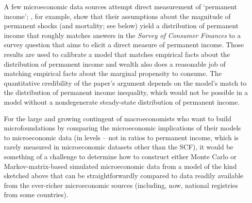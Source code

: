 \documentclass[BufferStockTheory]{subfiles}
\begin{document}
\begin{comment}
The problem is not with the growth factor $\PGro$; the same point would hold with $\PGro=1$, in which case the proposition would become
\begin{align}
    \cv(\cRat_{t+1},\pLevBF_{t+1})   & = \cv(\cRat_{t},\pLevBF_{t}) \label{eq:covSolnStable} .
\end{align}
\end{comment}

A few microeconomic data sources attempt direct measurement of `permanent income'; \cite{cstwMPC}, for example, show that their assumptions about the magnitude of permanent shocks (and mortality; see below) yield a distribution of permanent income that roughly matches answers in the \emph{Survey of Consumer Finances} to a survey question that aims to elicit a direct measure of permanent income.  Those results are used to calibrate a model that matches empirical facts about the distribution of permanent income and wealth also does a reasonable job of matching empirical facts about the marginal propensity to consume.  The quantitative credibility of the paper's argument depends on the model's match to the distribution of permanent income inequality, which would not be possible in a model without a nondegenerate steady-state distribution of permanent income.

For the large and growing contingent of macroeconomists who want to build microfoundations by comparing the microeconomic implications of their models to microeconomic data (in levels -- not in ratios to permanent income, which is rarely measured in microeconomic datasets other than the SCF), it would be something of a challenge to determine how to construct either Monte Carlo or Markov-matrix-based simulated microeconomic data from a model of the kind sketched above that can be straightforwardly compared to data readily available from the ever-richer microeconomic sources (including, now, national registries from some countries).  %
\end{document}
